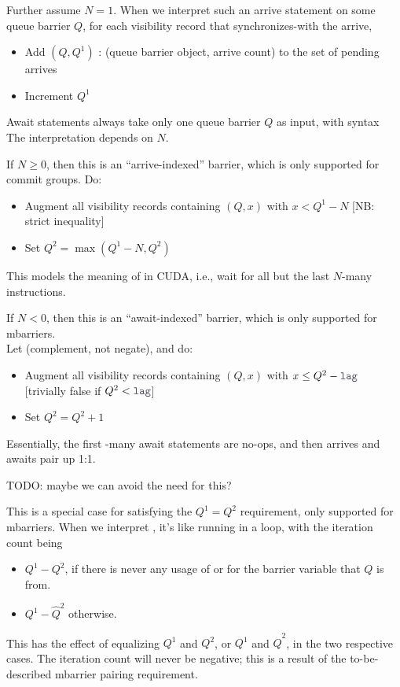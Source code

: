 \filbreak
Further assume $N = 1$.
When we interpret such an arrive statement on some queue barrier $Q$, for each visibility record that synchronizes-with the arrive,
\begin{itemize}
  \item Add $(Q, Q^1)$ : (queue barrier object, arrive count) to the set of pending arrives
  \item Increment $Q^1$
\end{itemize}

\filbreak
{}

Await statements always take only one queue barrier $Q$ as input, with syntax\\
The interpretation depends on $N$.

\filbreak
If $N \geq 0$, then this is an ``arrive-indexed'' barrier, which is only supported for commit groups. Do:
\begin{itemize}
  \item Augment all visibility records containing $(Q, x)$ with $x < Q^1 - N$ [NB: strict inequality]
  \item Set $Q^2 = \max(Q^1 - N, Q^2)$
\end{itemize}
This models the meaning of  in CUDA, i.e., wait for all but the last $N$-many  instructions.

\filbreak
If $N < 0$, then this is an ``await-indexed'' barrier, which is only supported for mbarriers.\\
Let  (complement, not negate), and do:
\begin{itemize}
  \item Augment all visibility records containing $(Q, x)$ with $x \leq Q^2 - \lighttt{lag}$ [trivially false if $Q^2 < \lighttt{lag}$]
  \item Set $Q^2 = Q^2 + 1$
\end{itemize}
Essentially, the first -many await statements are no-ops, and then arrives and awaits pair up 1:1.

\filbreak
{}

TODO: maybe we can avoid the need for this?

This is a special case for satisfying the $Q^1 = Q^2$ requirement, only supported for mbarriers.
When we interpret , it's like running
 in a loop, with the iteration count being
\begin{itemize}
  \item $Q^1 - Q^2$, if there is never any usage of  or  for the barrier variable that $Q$ is from.
  \item $Q^1 - \widehat{Q}^2$ otherwise.
\end{itemize}
This has the effect of equalizing $Q^1$ and $Q^2$, or $Q^1$ and $\widehat{Q}^2$, in the two respective cases.
The iteration count will never be negative; this is a result of the to-be-described mbarrier pairing requirement.

